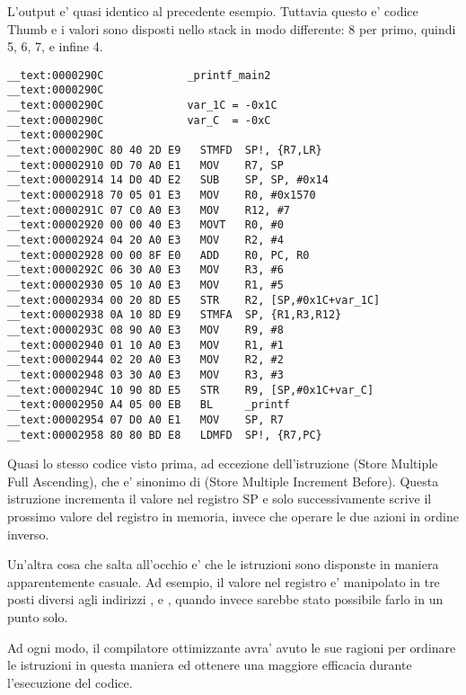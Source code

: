 L'output e' quasi identico al precedente esempio. Tuttavia questo e' codice Thumb e i valori sono disposti nello stack in modo differente:
8 per primo, quindi 5, 6, 7, e infine 4.

\myparagraph{\OptimizingXcodeIV: \ARMMode}

\begin{lstlisting}[style=customasmARM]
__text:0000290C             _printf_main2
__text:0000290C
__text:0000290C             var_1C = -0x1C
__text:0000290C             var_C  = -0xC
__text:0000290C
__text:0000290C 80 40 2D E9   STMFD  SP!, {R7,LR}
__text:00002910 0D 70 A0 E1   MOV    R7, SP
__text:00002914 14 D0 4D E2   SUB    SP, SP, #0x14
__text:00002918 70 05 01 E3   MOV    R0, #0x1570
__text:0000291C 07 C0 A0 E3   MOV    R12, #7
__text:00002920 00 00 40 E3   MOVT   R0, #0
__text:00002924 04 20 A0 E3   MOV    R2, #4
__text:00002928 00 00 8F E0   ADD    R0, PC, R0
__text:0000292C 06 30 A0 E3   MOV    R3, #6
__text:00002930 05 10 A0 E3   MOV    R1, #5
__text:00002934 00 20 8D E5   STR    R2, [SP,#0x1C+var_1C]
__text:00002938 0A 10 8D E9   STMFA  SP, {R1,R3,R12}
__text:0000293C 08 90 A0 E3   MOV    R9, #8
__text:00002940 01 10 A0 E3   MOV    R1, #1
__text:00002944 02 20 A0 E3   MOV    R2, #2
__text:00002948 03 30 A0 E3   MOV    R3, #3
__text:0000294C 10 90 8D E5   STR    R9, [SP,#0x1C+var_C]
__text:00002950 A4 05 00 EB   BL     _printf
__text:00002954 07 D0 A0 E1   MOV    SP, R7
__text:00002958 80 80 BD E8   LDMFD  SP!, {R7,PC}
\end{lstlisting}

Quasi lo stesso codice visto prima, ad eccezione dell'istruzione  (Store Multiple Full Ascending),
che e' sinonimo di  (Store Multiple Increment Before). 
Questa istruzione incrementa il valore nel registro \ac{SP} e solo successivamente scrive il prossimo valore del registro in memoria, invece che operare le due azioni in ordine inverso.

Un'altra cosa che salta all'occhio e' che le istruzioni sono disponste in maniera apparentemente casuale.
Ad esempio, il valore nel registro  e' manipolato in tre posti diversi
agli indirizzi ,  e , quando invece sarebbe stato possibile farlo in un punto solo.

Ad ogni modo, il compilatore ottimizzante avra' avuto le sue ragioni per ordinare le istruzioni in questa maniera ed ottenere una maggiore efficacia durante l'esecuzione del codice.

